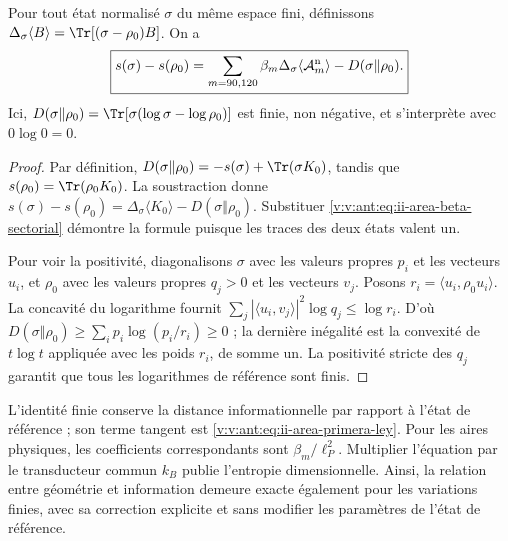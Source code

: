 \begin{theorem}
\label{v:v:ant:thm:ii-area-ley-finita}
Pour tout état normalisé \(\sigma\) du même espace fini,
définissons \(\Delta_\sigma\langle B\rangle
=\Tr[(\sigma-\rho_0)B]\). On a
\begin{equation}
 \boxed{
 s(\sigma)-s(\rho_0)
 =\sum_{m=90,120}\beta_m
      \Delta_\sigma\langle\mathcal A_m^{\rm n}\rangle
   -D(\sigma\Vert\rho_0).}
 \label{v:v:ant:eq:ii-area-ley-finita}
\end{equation}
Ici, \(D(\sigma\Vert\rho_0)=\Tr[\sigma(\log\sigma-\log\rho_0)]\)
est finie, non négative, et s'interprète avec \(0\log0=0\).
\end{theorem}
\begin{proof}
Par définition,
\(D(\sigma\Vert\rho_0)=-s(\sigma)+\Tr(\sigma K_0)\), tandis que
\(s(\rho_0)=\Tr(\rho_0K_0)\). La soustraction donne
\(s(\sigma)-s(\rho_0)=\Delta_\sigma\langle K_0\rangle
-D(\sigma\Vert\rho_0)\). Substituer
\eqref{v:v:ant:eq:ii-area-beta-sectorial} démontre la formule puisque les
traces des deux états valent un.

Pour voir la positivité, diagonalisons \(\sigma\) avec les valeurs propres
\(p_i\) et les vecteurs \(u_i\), et \(\rho_0\) avec les valeurs propres
\(q_j>0\) et les vecteurs \(v_j\). Posons
\(r_i=\langle u_i,\rho_0u_i\rangle\). La concavité du logarithme
fournit
\(\sum_j|\langle u_i,v_j\rangle|^2\log q_j\le\log r_i\).
D'où
\(D(\sigma\Vert\rho_0)\ge\sum_i p_i\log(p_i/r_i)\ge0\) ;
la dernière inégalité est la convexité de \(t\log t\) appliquée
avec les poids \(r_i\), de somme un. La positivité stricte des
\(q_j\) garantit que tous les logarithmes de référence sont finis.
\end{proof}

L'identité finie conserve la distance informationnelle par rapport à
l'état de référence ; son terme tangent est
\eqref{v:v:ant:eq:ii-area-primera-ley}. Pour les aires physiques, les
coefficients correspondants sont \(\beta_m/\ell_P^2\).
Multiplier l'équation par le transducteur commun \(k_B\) publie
l'entropie dimensionnelle. Ainsi, la relation entre géométrie et information
demeure exacte également pour les variations finies, avec sa correction
explicite et sans modifier les paramètres de l'état de référence.
